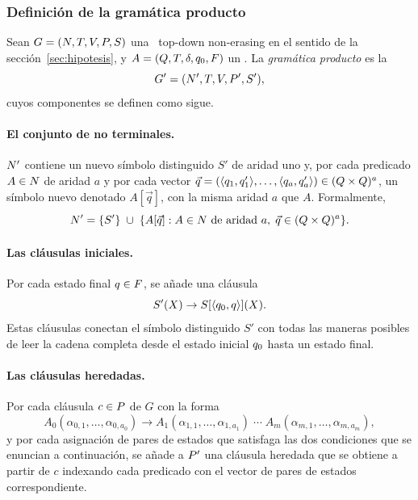 \subsubsection{Definición de la gramática producto}

\begin{definicion}
\label{def:gprime}
Sean $G = (N, T, V, P, S)$ una \PRCG\ top-down non-erasing en el sentido de la sección~\ref{sec:hipotesis}, y $A = (Q, T, \delta, q_0, F)$ un \AFD. La \emph{gramática producto} es la \PRCG
\[
G' = (N', T, V, P', S'),
\]
cuyos componentes se definen como sigue.
\end{definicion}

\paragraph{El conjunto de no terminales.} $N'$ contiene un nuevo símbolo distinguido $S'$ de aridad uno y, por cada predicado $A \in N$ de aridad $a$ y por cada vector $\vec{q} = (\langle q_1, q'_1 \rangle, \dots, \langle q_a, q'_a \rangle) \in (Q \times Q)^{a}$, un símbolo nuevo denotado $A[\vec{q}]$, con la misma aridad $a$ que $A$. Formalmente,
\[
N' = \{S'\} \;\cup\; \{ A[\vec{q}] : A \in N \text{ de aridad } a, \; \vec{q} \in (Q \times Q)^{a} \}.
\]

\paragraph{Las cláusulas iniciales.} Por cada estado final $q \in F$, se añade una cláusula
\[
S'(X) \to S[\langle q_0, q \rangle](X).
\]
Estas cláusulas conectan el símbolo distinguido $S'$ con todas las maneras posibles de leer la cadena completa desde el estado inicial $q_0$ hasta un estado final.

\paragraph{Las cláusulas heredadas.} Por cada cláusula $c \in P$ de $G$ con la forma
\[
A_0(\alpha_{0,1}, \dots, \alpha_{0, a_0}) \to A_1(\alpha_{1,1}, \dots, \alpha_{1, a_1}) \; \cdots \; A_m(\alpha_{m,1}, \dots, \alpha_{m, a_m}),
\]
y por cada asignación de pares de estados que satisfaga las dos condiciones que se enuncian a continuación, se añade a $P'$ una cláusula heredada que se obtiene a partir de $c$ indexando cada predicado con el vector de pares de estados correspondiente.

